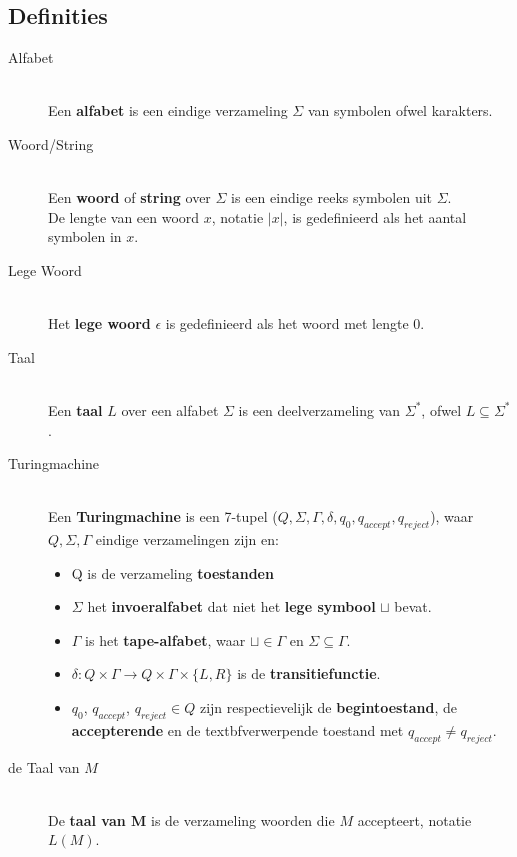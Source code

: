 \documentclass[]{article}
\begin{document}
\begin{itemize}
		
\section*{Definities}
\begin{description}
	\item[Alfabet] \hfill \\
	Een \textbf{alfabet} is een eindige verzameling $\Sigma$ van symbolen ofwel karakters.
	
	\item[Woord/String] \hfill \\
	Een \textbf{woord} of \textbf{string} over $\Sigma$ is een eindige reeks symbolen uit $\Sigma$.\\
	De lengte van een woord $x$, notatie $\vert x \vert$, is gedefinieerd als het aantal symbolen in $x$.
	
	\item[Lege Woord] \hfill \\
	Het \textbf{lege woord} $\epsilon$ is gedefinieerd als het woord met lengte 0.
	
	\item[Taal] \hfill \\
	Een \textbf{taal} $L$ over een alfabet $\Sigma$ is een deelverzameling van $\Sigma^*$, ofwel $L \subseteq \Sigma^*$.
	
	\item[Turingmachine] \hfill \\
	Een \textbf{Turingmachine} is een 7-tupel ($Q, \Sigma, \Gamma, \delta, q_0, q_{accept}, q_{reject}$), waar $Q, \Sigma, \Gamma$ eindige verzamelingen zijn en:
	\begin{itemize}
		\item Q is de verzameling \textbf{toestanden}
		\item $\Sigma$ het \textbf{invoeralfabet} dat niet het \textbf{lege symbool} $\sqcup$ bevat.
		\item $\Gamma$ is het \textbf{tape-alfabet}, waar $\sqcup \in \Gamma$ en $\Sigma \subseteq \Gamma$.
		\item $\delta : Q \times \Gamma \longrightarrow Q \times \Gamma \times \{ L, R \}$ is de \textbf{transitiefunctie}.
		\item $q_0$, $q_{accept}$, $q_{reject} \in Q$ zijn respectievelijk de \textbf{begintoestand}, de \textbf{accepterende} en de textbf{verwerpende toestand} met $q_{accept} \neq q_{reject}$. 
	\end{itemize}
	
	\item[de Taal van $M$] \hfill \\
	De \textbf{taal van M} is de verzameling woorden die $M$ accepteert, notatie $L(M)$.
	

\end{description}
\end{itemize}
\end{document}
